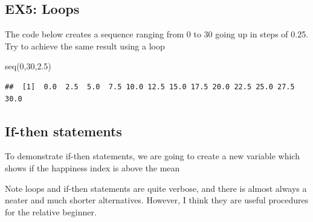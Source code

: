 \documentclass[]{article}
\newenvironment{Shaded}{\begin{snugshade}}{\end{snugshade}}
\newcommand{\CommentTok}[1]{\textcolor[rgb]{0.56,0.35,0.01}{\textit{#1}}}
\newcommand{\ControlFlowTok}[1]{\textcolor[rgb]{0.13,0.29,0.53}{\textbf{#1}}}
\newcommand{\DecValTok}[1]{\textcolor[rgb]{0.00,0.00,0.81}{#1}}
\newcommand{\FloatTok}[1]{\textcolor[rgb]{0.00,0.00,0.81}{#1}}
\newcommand{\FunctionTok}[1]{\textcolor[rgb]{0.00,0.00,0.00}{#1}}
\newcommand{\NormalTok}[1]{#1}
\newcommand{\OtherTok}[1]{\textcolor[rgb]{0.56,0.35,0.01}{#1}}
\newcommand{\SpecialCharTok}[1]{\textcolor[rgb]{0.00,0.00,0.00}{#1}}
\begin{document}
\hypertarget{ex5-loops}{%
\subsection{EX5: Loops}\label{ex5-loops}}

The code below creates a sequence ranging from 0 to 30 going up in steps
of 0.25. Try to achieve the same result using a loop

\begin{Shaded}
\begin{Highlighting}[]
\FunctionTok{seq}\NormalTok{(}\DecValTok{0}\NormalTok{,}\DecValTok{30}\NormalTok{,}\FloatTok{2.5}\NormalTok{)}
\end{Highlighting}
\end{Shaded}

\begin{verbatim}
##  [1]  0.0  2.5  5.0  7.5 10.0 12.5 15.0 17.5 20.0 22.5 25.0 27.5 30.0
\end{verbatim}

\hypertarget{if-then-statements}{%
\subsection{If-then statements}\label{if-then-statements}}

To demonstrate if-then statements, we are going to create a new variable
which shows if the happiness index is above the mean

\begin{Shaded}
\end{Shaded}

Note loops and if-then statements are quite verbose, and there is almost
always a neater and much shorter alternatives. However, I think they are
useful procedures for the relative beginner.
\end{document}
